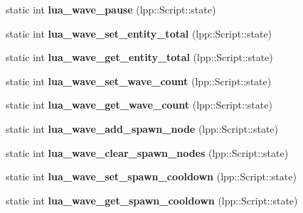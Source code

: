 \begin{DoxyCompactItemize}
\item 
static int {\bfseries lua\+\_\+wave\+\_\+pause} (lpp\+::\+Script\+::state)\hypertarget{class_lua_interface_a10824b692f08b0258b2f35ec6f4f428c}{}\label{class_lua_interface_a10824b692f08b0258b2f35ec6f4f428c}

\item 
static int {\bfseries lua\+\_\+wave\+\_\+set\+\_\+entity\+\_\+total} (lpp\+::\+Script\+::state)\hypertarget{class_lua_interface_a1f6c20ec27cd2d263ac24a0b54aeb826}{}\label{class_lua_interface_a1f6c20ec27cd2d263ac24a0b54aeb826}

\item 
static int {\bfseries lua\+\_\+wave\+\_\+get\+\_\+entity\+\_\+total} (lpp\+::\+Script\+::state)\hypertarget{class_lua_interface_a2a11be6a967bec73285f6ba4eaa0fb45}{}\label{class_lua_interface_a2a11be6a967bec73285f6ba4eaa0fb45}

\item 
static int {\bfseries lua\+\_\+wave\+\_\+set\+\_\+wave\+\_\+count} (lpp\+::\+Script\+::state)\hypertarget{class_lua_interface_a21b9535825623e7b8ce89a5be3033e35}{}\label{class_lua_interface_a21b9535825623e7b8ce89a5be3033e35}

\item 
static int {\bfseries lua\+\_\+wave\+\_\+get\+\_\+wave\+\_\+count} (lpp\+::\+Script\+::state)\hypertarget{class_lua_interface_a3ed8eee294e4a5a4131aceaac8a58546}{}\label{class_lua_interface_a3ed8eee294e4a5a4131aceaac8a58546}

\item 
static int {\bfseries lua\+\_\+wave\+\_\+add\+\_\+spawn\+\_\+node} (lpp\+::\+Script\+::state)\hypertarget{class_lua_interface_abf705541517f4d7c84fe89b6e86411fe}{}\label{class_lua_interface_abf705541517f4d7c84fe89b6e86411fe}

\item 
static int {\bfseries lua\+\_\+wave\+\_\+clear\+\_\+spawn\+\_\+nodes} (lpp\+::\+Script\+::state)\hypertarget{class_lua_interface_acf861a9fc32675e59b9ab32f2da0179b}{}\label{class_lua_interface_acf861a9fc32675e59b9ab32f2da0179b}

\item 
static int {\bfseries lua\+\_\+wave\+\_\+set\+\_\+spawn\+\_\+cooldown} (lpp\+::\+Script\+::state)\hypertarget{class_lua_interface_a6576771d2b9b41c27c7721c46f354d04}{}\label{class_lua_interface_a6576771d2b9b41c27c7721c46f354d04}

\item 
static int {\bfseries lua\+\_\+wave\+\_\+get\+\_\+spawn\+\_\+cooldown} (lpp\+::\+Script\+::state)\hypertarget{class_lua_interface_ad0a1911eff538cfc976ee25fbb1c0cae}{}\label{class_lua_interface_ad0a1911eff538cfc976ee25fbb1c0cae}


\end{DoxyCompactItemize}

